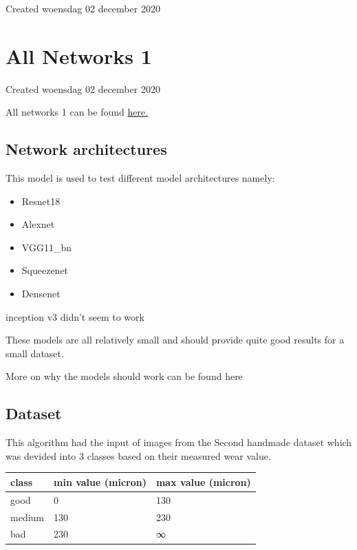 \documentclass{article}
\begin{document}
Created woensdag 02 december 2020




		\section{All Networks 1}

Created woensdag 02 december 2020



All networks 1 can be found \href{https://colab.research.google.com/drive/1bWt0DgypiYoOOgnSGjlmSdDo7elvJnH4}{here.}



\subsection{Network architectures}

This model is used to test different model architectures namely:

\begin{itemize}
\item Resnet18
\item Alexnet
\item VGG11\_bn
\item Squeezenet
\item Densenet
\end{itemize}


inception v3 didn't seem to work



These models are all relatively small and should provide quite good results for a small dataset. 

More on why the models should work can be found here



\subsection{Dataset}



This algorithm had the input of images from the Second handmade dataset which was devided into 3 classes based on their measured wear value. 

\begin{tabular}{ |l|l|l| }
\hline
 class & min value (micron) & max value (micron) \tabularnewline
\hline
\hline
 good & 0 & 130 \tabularnewline
\hline
 medium & 130 & 230 \tabularnewline
\hline
 bad & 230 & ∞ \tabularnewline
\hline
\end{tabular}
\end{document}
